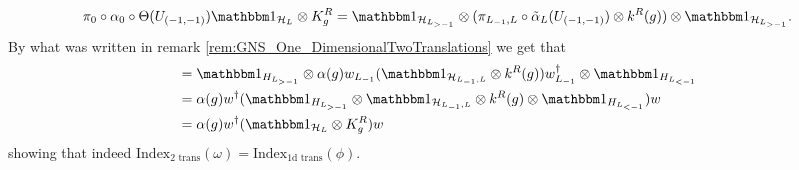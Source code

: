 \documentclass[12pt,a4paper,twoside]{article}
\numberwithin{equation}{section}
\begin{document}
\begin{equation}
	\pi_0\circ\alpha_0\circ\Theta(U_{(-1,-1)})\id_{\HH_L}\otimes K_g^R=\id_{\HH_{L_{>-1}}}\otimes(\pi_{L_{-1},L}\circ\tilde\alpha_L(U_{(-1,-1)})\otimes k^R(g))\otimes\id_{\HH_{L_{>-1}}}.
\end{equation}
By what was written in remark \ref{rem:GNS_One_DimensionalTwoTranslations} we get that
\begin{align}
	&=\id_{H_{L_{>-1}}}\otimes\alpha(g) w_{L_{-1}}(\id_{\HH_{L_{-1},L}}\otimes k^R(g))w_{L_{-1}}^\dagger\otimes \id_{H_{L_{<-1}}}\\
	&=\alpha(g)w^\dagger (\id_{H_{L_{>-1}}}\otimes \id_{\HH_{L_{-1},L}}\otimes k^R(g)\otimes \id_{H_{L_{<-1}}}) w\\
	&=\alpha(g)w^\dagger (\id_{\HH_L}\otimes K^R_g) w
\end{align}
showing that indeed $\textrm{Index}_{\text{2 trans}}(\omega)=\textrm{Index}_{\text{1d trans}}(\phi)$.
\end{document}
